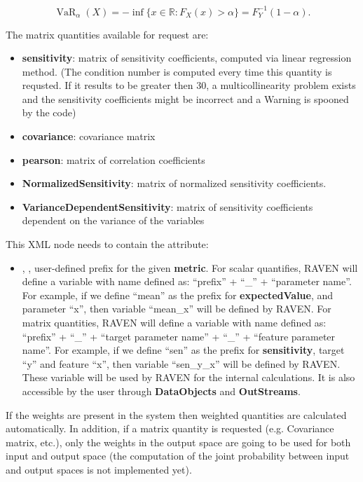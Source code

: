 \begin{itemize}
\begin{itemize}
    \begin{equation}
      \operatorname{VaR}_\alpha(X)=-\inf\big\{x\in\mathbb{R}:F_X(x)>\alpha\big\} = F^{-1}_Y(1-\alpha).
    \end{equation}

  \end{itemize}
  The matrix quantities available for request are:
  \begin{itemize}
    \item \textbf{sensitivity}: matrix of sensitivity coefficients, computed via linear regression method. (\nb The condition number is computed every time this quantity is requsted. If it results
    to be greater then $30$, a multicollinearity problem exists and the sensitivity coefficients 
    might be incorrect and a Warning is spooned by the code)
    \item \textbf{covariance}: covariance matrix
    \item \textbf{pearson}: matrix of correlation coefficients
    \item \textbf{NormalizedSensitivity}: matrix of normalized sensitivity
    coefficients. 
    \item \textbf{VarianceDependentSensitivity}: matrix of sensitivity coefficients dependent on the variance of the variables
  \end{itemize}
  This XML node needs to contain the attribute:
  \begin{itemize}
    \itemsep0em
    \item {}, , user-defined prefix for the given \textbf{metric}.
      For scalar quantifies, RAVEN will define a variable with name defined as:  ``prefix'' + ``\_'' + ``parameter name''.
      For example, if we define ``mean'' as the prefix for \textbf{expectedValue}, and parameter ``x'', then variable
      ``mean\_x'' will be defined by RAVEN.
      For matrix quantities, RAVEN will define a variable with name defined as: ``prefix'' + ``\_'' + ``target parameter name'' + ``\_'' + ``feature parameter name''.
      For example, if we define ``sen'' as the prefix for \textbf{sensitivity}, target ``y'' and feature ``x'', then
      variable ``sen\_y\_x'' will be defined by RAVEN.
      \nb These variable will be used by RAVEN for the internal calculations. It is also accessible by the user through
      \textbf{DataObjects} and \textbf{OutStreams}.
  \end{itemize}
  \nb If the weights are present in the system then weighted quantities are calculated automatically. In addition, if a matrix quantity is requested (e.g. Covariance matrix, etc.), only the weights in the output space are going to be used for both input and output space (the computation of the joint probability between input and output spaces is not implemented yet).

\end{itemize}
